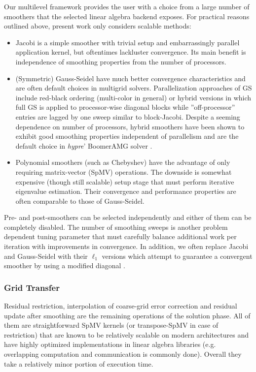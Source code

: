 Our multilevel framework provides the user with a choice from a large number of smoothers that the selected linear algebra backend exposes.   For practical reasons outlined above, present work only considers scalable methods:
\begin{itemize}
    \item Jacobi is a simple smoother with trivial setup and embarrassingly parallel application kernel, but oftentimes lackluster convergence.   Its main benefit is independence of smoothing properties from the number of processors.
    \item (Symmetric) Gauss-Seidel have much better convergence characteristics and are often default choices in multigrid solvers.    Parallelization approaches of GS include red-black ordering (multi-color in general) or hybrid versions in which full GS is applied to processor-wise diagonal blocks while ''off-processor'' entries are lagged by one sweep similar to block-Jacobi.   Despite a seeming dependence on number of processors, hybrid smoothers have been shown to exhibit good smoothing properties independent of parallelism \cite{Baker2011} and are the default choice in \textit{hypre}' BoomerAMG solver \cite{Henson2002}.
    \item Polynomial smoothers (such as Chebyshev) have the advantage of only requiring matrix-vector (SpMV) operations.   The downside is somewhat expensive (though still scalable) setup stage that must perform iterative eigenvalue estimation.   Their convergence and performance properties are often comparable to those of Gauss-Seidel.
\end{itemize}
Pre- and post-smoothers can be selected independently and either of them can be completely disabled.   The number of smoothing sweeps is another problem dependent tuning parameter that must carefully balance additional work per iteration with improvements in convergence.   In addition, we often replace Jacobi and Gauss-Seidel with their $\ell_1$ versions which attempt to guarantee a convergent smoother by using a modified diagonal \cite{Baker2011}.

\subsubsection{Grid Transfer}
\label{subsec:par_kernels_apply_transfer}

Residual restriction, interpolation of coarse-grid error correction and residual update after smoothing are the remaining operations of the solution phase.   All of them are straightforward SpMV kernels (or transpose-SpMV in case of restriction) that are known to be relatively scalable on modern architectures and have highly optimized implementations in linear algebra libraries (e.g. overlapping computation and communication is commonly done).   Overall they take a relatively minor portion of execution time.


